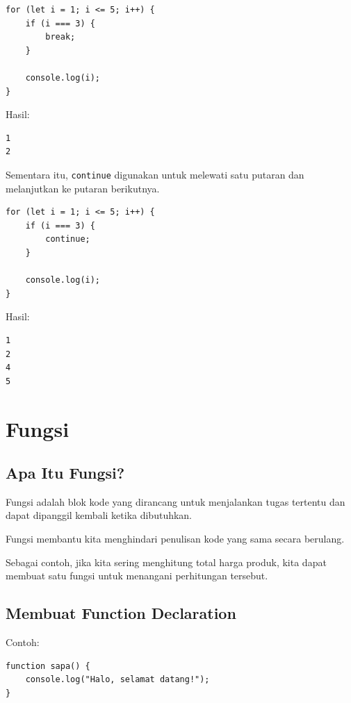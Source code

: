 \documentclass[12pt,a4paper]{article}
\begin{document}
\begin{lstlisting}
for (let i = 1; i <= 5; i++) {
    if (i === 3) {
        break;
    }

    console.log(i);
}
\end{lstlisting}

Hasil:

\begin{lstlisting}
1
2
\end{lstlisting}

Sementara itu, \texttt{continue} digunakan untuk
melewati satu putaran dan melanjutkan ke putaran
berikutnya.

\begin{lstlisting}
for (let i = 1; i <= 5; i++) {
    if (i === 3) {
        continue;
    }

    console.log(i);
}
\end{lstlisting}

Hasil:

\begin{lstlisting}
1
2
4
5
\end{lstlisting}

\section{Fungsi}

\subsection{Apa Itu Fungsi?}

Fungsi adalah blok kode yang dirancang untuk
menjalankan tugas tertentu dan dapat dipanggil
kembali ketika dibutuhkan.

Fungsi membantu kita menghindari penulisan kode
yang sama secara berulang.

Sebagai contoh, jika kita sering menghitung total
harga produk, kita dapat membuat satu fungsi
untuk menangani perhitungan tersebut.

\subsection{Membuat Function Declaration}

Contoh:

\begin{lstlisting}
function sapa() {
    console.log("Halo, selamat datang!");
}
\end{lstlisting}
\end{document}
